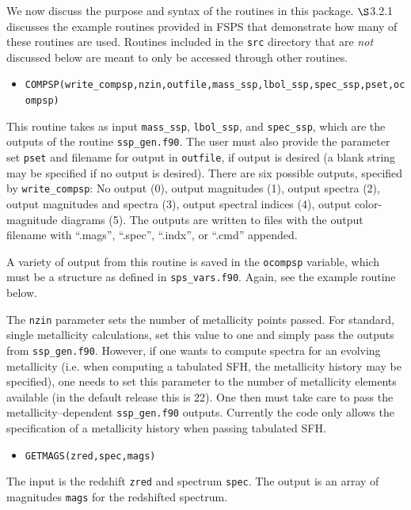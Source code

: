 \documentclass[]{article}
\begin{document}
\noindent
We now discuss the purpose and syntax of the routines in this package.
$\S$3.2.1 discusses the example routines provided in FSPS that demonstrate how
many of these routines are used.  Routines included in the \texttt{src}
directory that are {\it not} discussed below are meant to only be accessed
through other routines.


\begin{itemize}
\item \texttt{COMPSP(write\_compsp,nzin,outfile,mass\_ssp,lbol\_ssp,spec\_ssp,pset,ocompsp)}
\end{itemize}

This routine takes as input \texttt{mass\_ssp}, \texttt{lbol\_ssp}, and
\texttt{spec\_ssp}, which are the outputs of the routine \texttt{ssp\_gen.f90}.
The user must also provide the parameter set \texttt{pset} and filename for
output in \texttt{outfile}, if output is desired (a blank string may be
specified if no output is desired). There are six possible outputs, specified by
\texttt{write\_compsp}: No output (0), output magnitudes (1), output spectra
(2), output magnitudes and spectra (3), output spectral indices (4), output
color-magnitude diagrams (5).  The outputs are written to files with the output
filename with ``.mags'', ``.spec'', ``.indx'', or ``.cmd'' appended.

A variety of output from this routine is saved in the \texttt{ocompsp} variable,
which must be a structure as defined in \texttt{sps\_vars.f90}.  Again, see the
example routine below.

The \texttt{nzin} parameter sets the number of metallicity points passed.  For
standard, single metallicity calculations, set this value to one and simply pass
the outputs from \texttt{ssp\_gen.f90}. However, if one wants to compute spectra
for an evolving metallicity (i.e. when computing a tabulated SFH, the
metallicity history may be specified), one needs to set this parameter to the
number of metallicity elements available (in the default release this is 22).
One then must take care to pass the metallicity--dependent \texttt{ssp\_gen.f90}
outputs.  Currently the code only allows the specification of a metallicity
history when passing tabulated SFH.


\begin{itemize}
\item \texttt{GETMAGS(zred,spec,mags)}
\end{itemize}

The input is the redshift \texttt{zred} and spectrum \texttt{spec}. The output
is an array of magnitudes \texttt{mags} for the redshifted spectrum.
\end{document}
